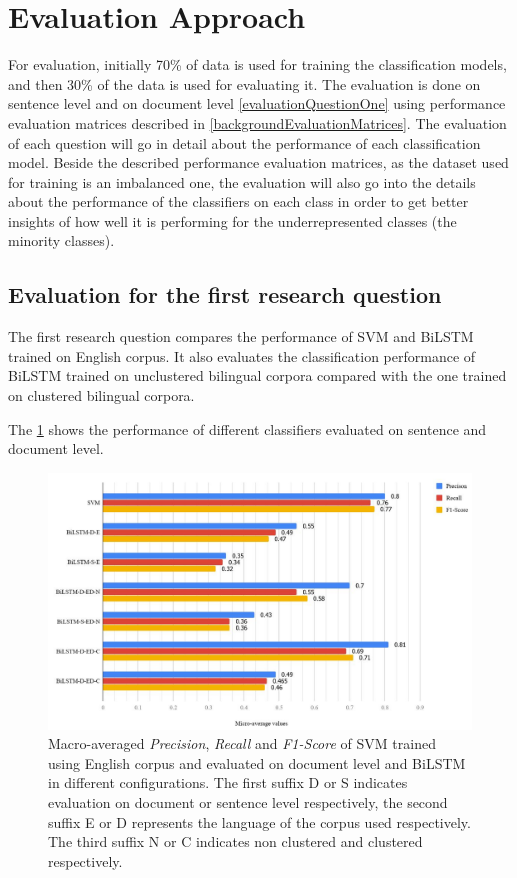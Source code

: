\section{Evaluation Approach}
For evaluation, initially 70\% of data is used for training the classification models, and then 30\% of the data is used for evaluating it. The evaluation is done on sentence level and on document level \ref{evaluationQuestionOne} using performance evaluation matrices described in \ref{backgroundEvaluationMatrices}. The evaluation of each question will go in detail about the performance of each classification model. Beside the described performance evaluation matrices, as the dataset used for training is an imbalanced one, the evaluation will also go into the details about the performance of the classifiers on each class in order to get better insights of how well it is performing for the underrepresented classes (the minority classes).


\subsection{Evaluation for the first research question} \label{EvalQ1}

The first research question compares the performance of \gls{SVM} and \gls{BiLSTM} trained on English corpus. It also evaluates the classification performance of \gls{BiLSTM} trained on unclustered bilingual corpora compared with the one trained on clustered bilingual corpora.  

The \ref{fig:question1Eval} shows the performance of different classifiers evaluated on sentence and document level.

\begin{figure}[!ht]
    \centering
    \includegraphics[width=15cm, keepaspectratio]{pics/1.jpg}
    \caption{Macro-averaged \textit{Precision}, \textit{Recall} and \textit{F1-Score} of \gls{SVM} trained using English corpus and evaluated on document level and \gls{BiLSTM} in different configurations. The first suffix D or S indicates evaluation on document or sentence level respectively, the second suffix E or D represents the language of the corpus used respectively. The third suffix N or C indicates non clustered and clustered respectively. }
    \label{fig:question1Eval}
\end{figure}

